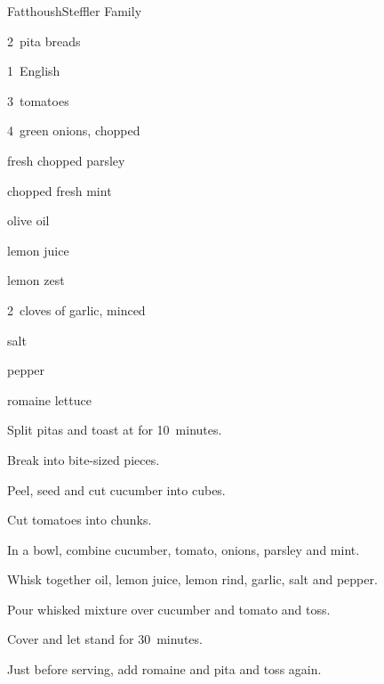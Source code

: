 \begin{recipe}{Fatthoush}{Steffler Family}{}

\begin{ingredients}
\item 2~pita breads
\item 1~English 
\item 3~tomatoes
\item 4~green onions, chopped
\item \C{\half} fresh chopped parsley
\item \C{\quarter} chopped fresh mint
\item {} olive oil
\item {} lemon juice
\item {} lemon zest
\item 2~cloves of garlic, minced
\item \tp{\half} salt
\item \tp{\half} pepper
\item {} romaine lettuce
\end{ingredients}

\begin{directions}
\item Split pitas and toast at  for 10~minutes.
\item Break into bite-sized pieces.
\item Peel, seed and cut cucumber into  cubes.
\item Cut tomatoes into  chunks.
\item In a bowl, combine cucumber, tomato, onions, parsley and mint.
\item Whisk together oil, lemon juice, lemon rind, garlic, salt and pepper.
\item Pour whisked mixture over cucumber and tomato and toss.
\item Cover and let stand for 30~minutes.
\item Just before serving, add romaine and pita and toss again.
\end{directions}
\end{recipe}

